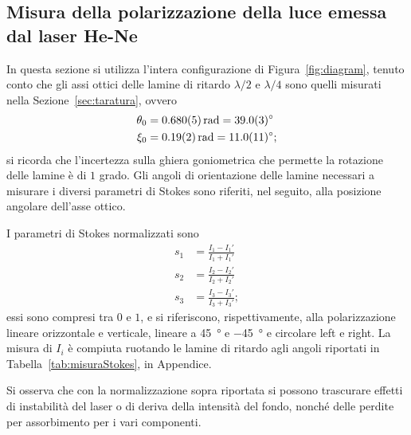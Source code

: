 \documentclass[10pt,oneside,a4paper]{article}
\begin{document}
\begin{multicols}{2}
\section{Misura della polarizzazione della luce emessa dal laser He-Ne}
In questa sezione si utilizza l'intera configurazione di Figura~\ref{fig:diagram}, tenuto conto che gli assi ottici delle lamine di ritardo $\lambda / 2$ e $\lambda / 4$ sono quelli misurati nella Sezione~\ref{sec:taratura}, ovvero
\[
\begin{aligned}
\theta_0 &= \SI{0.680\pm0.005}{rad} = \SI{39.0 \pm 0.3}{\degree} \\
\xi_0 &= \SI{0.19\pm0.02}{rad} = \SI{11.0 \pm 1.1}{\degree};
\end{aligned}
\]
si ricorda che l'incertezza sulla ghiera goniometrica che permette la rotazione delle lamine è di $1$ grado. Gli angoli di orientazione delle lamine necessari a misurare i diversi parametri di Stokes sono riferiti, nel seguito, alla posizione angolare dell'asse ottico.

I parametri di Stokes normalizzati sono
\[
\begin{aligned}
s_1 &= \frac{I_1 - I_1'}{I_1 + I_1'} \\
s_2 &= \frac{I_2 - I_2'}{I_2 + I_2'} \\
s_3 &= \frac{I_3 - I_3'}{I_3 + I_3'};
\end{aligned}
\]
essi sono compresi tra $0$ e $1$, e si riferiscono, rispettivamente, alla polarizzazione lineare orizzontale e verticale, lineare a \SI{45}{\degree} e \SI{-45}{\degree} e circolare left e right. La misura di $I_i$ è compiuta ruotando le lamine di ritardo agli angoli riportati in Tabella~\ref{tab:misuraStokes}, in Appendice.

Si osserva che con la normalizzazione sopra riportata si possono trascurare effetti di instabilità del laser o di deriva della intensità del fondo, nonché delle perdite per assorbimento per i vari componenti.


\end{multicols}
\end{document}
